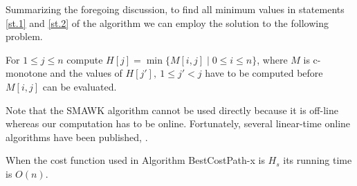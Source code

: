 Summarizing the foregoing discussion, to find all minimum values in statements \ref{st.1} and \ref{st.2} of the algorithm we can employ the solution to the following problem.
\begin{problem}
		For $1\leq j \leq n$ compute $H[j]=\min \{M[i,j] \mid 0\leq i \leq n\}$, where 
		$M$ is c-monotone and
	the values of $H[j'],\ 1\leq j'<j$ have to be computed before $M[i,j]$ can be evaluated.
\end{problem}
Note that the SMAWK algorithm cannot
be used directly because it is off-line whereas our computation has to be online.
Fortunately, several linear-time online algorithms have been published, 
\cite{klawe89,larmore91,galil92,barnoy09}.

\begin{theorem}
	When the cost function used in Algorithm BestCostPath-x is $H_s$ its running time is $O(n)$.
\end{theorem}

\
